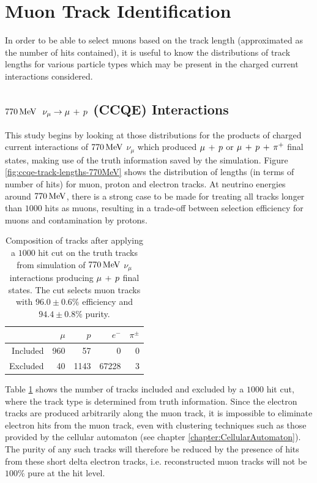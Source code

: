 \section{Muon Track Identification}
In order to be able to select muons based on the track length (approximated as the number of hits contained), it is useful to know the distributions of track lengths for various particle types which may be present in the charged current interactions considered. 

\subsection{$770\MeV$ \texorpdfstring{$\nu_\mu \rightarrow \mu\,+\,p$}{ν\_μ → μ + p} (CCQE) Interactions}
This study begins by looking at those distributions for the products of charged current interactions of $770\MeV$ $\nu_\mu$ which produced $\mu\,+\,p$ or $\mu\,+\,p\,+\,\pi^{+}$ final states, making use of the truth information saved by the simulation. Figure \ref{fig:ccqe-track-lengths-770MeV} shows the distribution of lengths (in terms of number of hits) for muon, proton and electron tracks. At neutrino energies around $770\MeV$, there is a strong case to be made for treating all tracks longer than $1000$ hits as muons, resulting in a trade-off between selection efficiency for muons and contamination by protons.

\begin{table}
\centering
\begin{tabular}{*{5}{r}}
 & $\mu$ & $p$ & $e^-$ & $\pi^\pm$ \\
\hline
\hline
Included & 960 & 57 & 0 & 0 \\
Excluded & 40 & 1143 & 67228 & 3 \\
\hline
\end{tabular}
\caption[Composition of tracks after $1000$ hit cut on $770\MeV$ CCQE events]{\label{table:cut-results-ccqe-0.77}Composition of tracks after applying a $1000$ hit cut on the truth tracks from simulation of $770\MeV$ $\nu_\mu$ interactions producing $\mu\,+\,p$ final states. The cut selects muon tracks with $96.0\pm0.6\%$ efficiency and $94.4\pm0.8\%$ purity.}
\end{table}

Table \ref{table:cut-results-ccqe-0.77} shows the number of tracks included and excluded by a $1000$ hit cut, where the track type is determined from truth information. Since the electron tracks are produced arbitrarily along the muon track, it is impossible to eliminate electron hits from the muon track, even with clustering techniques such as those provided by the cellular automaton (see chapter \ref{chapter:CellularAutomaton}). The purity of any such tracks will therefore be reduced by the presence of hits from these short delta electron tracks, i.e. reconstructed muon tracks will not be $100\%$ pure at the hit level.


